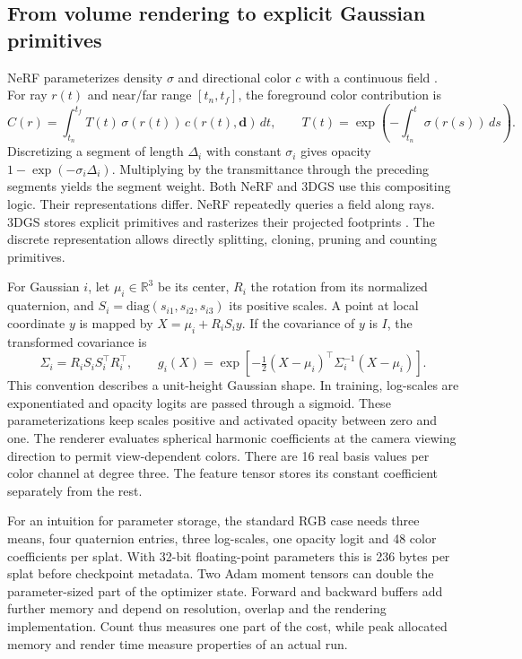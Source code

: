 \subsection{From volume rendering to explicit Gaussian primitives}
NeRF parameterizes density $\sigma$ and directional color $c$ with a continuous field \cite{ref3}. For ray $r(t)$ and near/far range $[t_n,t_f]$, the foreground color contribution is
\begin{equation}
  C(r)=\int_{t_n}^{t_f}\!T(t)\,\sigma(r(t))\,c(r(t),\mathbf d)\,dt,\qquad
  T(t)=\exp\!\left(-\int_{t_n}^{t}\!\sigma(r(s))\,ds\right).
\end{equation}
Discretizing a segment of length $\Delta_i$ with constant $\sigma_i$ gives opacity $1-\exp(-\sigma_i\Delta_i)$. Multiplying by the transmittance through the preceding segments yields the segment weight. Both NeRF and 3DGS use this compositing logic. Their representations differ. NeRF repeatedly queries a field along rays. 3DGS stores explicit primitives and rasterizes their projected footprints \cite{ref4}. The discrete representation allows directly splitting, cloning, pruning and counting primitives.

For Gaussian $i$, let $\mu_i\in\mathbb R^3$ be its center, $R_i$ the rotation from its normalized quaternion, and $S_i=\mathrm{diag}(s_{i1},s_{i2},s_{i3})$ its positive scales. A point at local coordinate $y$ is mapped by $X=\mu_i+R_iS_i y$. If the covariance of $y$ is $I$, the transformed covariance is
\begin{equation}
 \Sigma_i=R_iS_iS_i^\top R_i^\top,\qquad
 g_i(X)=\exp\!\left[-\tfrac12(X-\mu_i)^\top\Sigma_i^{-1}(X-\mu_i)\right].
\end{equation}
This convention describes a unit-height Gaussian shape. In training, log-scales are exponentiated and opacity logits are passed through a sigmoid. These parameterizations keep scales positive and activated opacity between zero and one. The renderer evaluates spherical harmonic coefficients at the camera viewing direction to permit view-dependent colors. There are 16 real basis values per color channel at degree three. The feature tensor stores its constant coefficient separately from the rest.

For an intuition for parameter storage, the standard RGB case needs three means, four quaternion entries, three log-scales, one opacity logit and 48 color coefficients per splat. With 32-bit floating-point parameters this is 236 bytes per splat before checkpoint metadata. Two Adam moment tensors can double the parameter-sized part of the optimizer state. Forward and backward buffers add further memory and depend on resolution, overlap and the rendering implementation. Count thus measures one part of the cost, while peak allocated memory and render time measure properties of an actual run.

